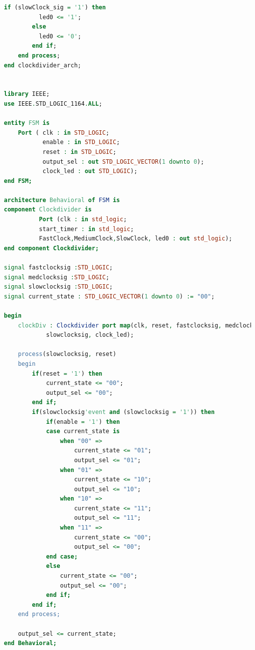 \documentclass[11pt]{article}
\begin{document}
\begin{appendices}
\begin{lstlisting}[language=VHDL]
        if (slowClock_sig = '1') then
		  led0 <= '1';
	    else
		  led0 <= '0';
	    end if;
	end process;
end clockdivider_arch;


library IEEE;
use IEEE.STD_LOGIC_1164.ALL;

entity FSM is
    Port ( clk : in STD_LOGIC;
           enable : in STD_LOGIC;
           reset : in STD_LOGIC;
           output_sel : out STD_LOGIC_VECTOR(1 downto 0);
           clock_led : out STD_LOGIC);
end FSM;

architecture Behavioral of FSM is
component Clockdivider is 
          Port (clk : in std_logic;
          start_timer : in std_logic;
	      FastClock,MediumClock,SlowClock, led0 : out std_logic);
end component Clockdivider;

signal fastclocksig :STD_LOGIC;
signal medclocksig :STD_LOGIC;
signal slowclocksig :STD_LOGIC;
signal current_state : STD_LOGIC_VECTOR(1 downto 0) := "00";

begin
    clockDiv : Clockdivider port map(clk, reset, fastclocksig, medclocksig, 
    		slowclocksig, clock_led);
    
    process(slowclocksig, reset)
    begin
        if(reset = '1') then
            current_state <= "00";
            output_sel <= "00";
        end if;
        if(slowclocksig'event and (slowclocksig = '1')) then
            if(enable = '1') then
            case current_state is
                when "00" =>
                    current_state <= "01";
                    output_sel <= "01";
                when "01" =>
                    current_state <= "10";
                    output_sel <= "10";
                when "10" =>
                    current_state <= "11";
                    output_sel <= "11";
                when "11" =>
                    current_state <= "00";
                    output_sel <= "00";
            end case;
            else
                current_state <= "00";
                output_sel <= "00";
            end if;
        end if;
    end process;
    
    output_sel <= current_state;
end Behavioral;
\end{lstlisting}


\end{appendices}
\end{document}
